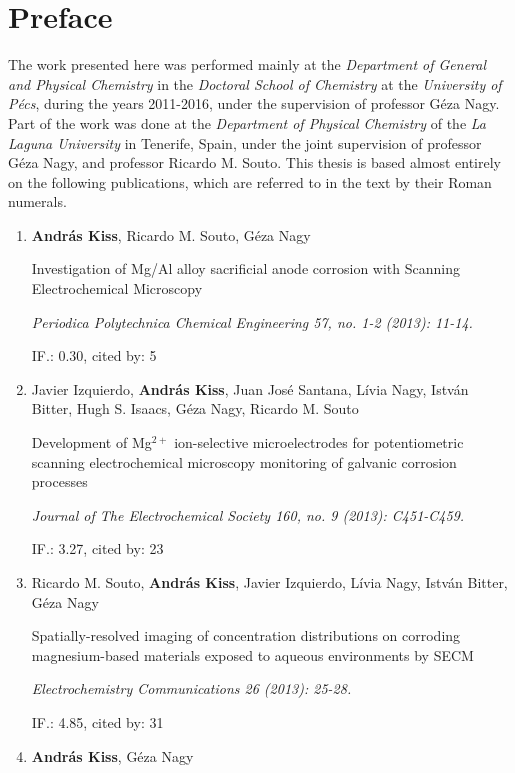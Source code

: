 \chapter*{Preface}
The work presented here was performed mainly at the \emph{Department of General and Physical Chemistry} in the \emph{Doctoral School of Chemistry} at the \emph{University of Pécs}, during the years 2011-2016, under the supervision of professor Géza Nagy.
Part of the work was done at the \emph{Department of Physical Chemistry} of the \emph{La Laguna University} in Tenerife, Spain, under the joint supervision of professor Géza Nagy, and professor Ricardo M. Souto.
This thesis is based almost entirely on the following publications, which are referred to in the text by their Roman numerals.

\begin{enumerate}
\item \textbf{András Kiss}, Ricardo M. Souto, Géza Nagy

Investigation of Mg/Al alloy sacrificial anode corrosion with Scanning Electrochemical Microscopy

\emph{Periodica Polytechnica Chemical Engineering 57, no. 1-2 (2013): 11-14.}

IF.: 0.30, cited by: 5

\item Javier Izquierdo, \textbf{András Kiss}, Juan José Santana, Lívia Nagy, István Bitter, Hugh S. Isaacs, Géza Nagy, Ricardo M. Souto

Development of Mg$^{2+}$ ion-selective microelectrodes for potentiometric scanning electrochemical microscopy monitoring of galvanic corrosion processes

\emph{Journal of The Electrochemical Society 160, no. 9 (2013): C451-C459.}

IF.: 3.27, cited by: 23

\item Ricardo M. Souto, \textbf{András Kiss}, Javier Izquierdo, Lívia Nagy, István Bitter, Géza Nagy

Spatially-resolved imaging of concentration distributions on corroding mag\-ne\-si\-um-based materials exposed to aqueous environments by SECM

\emph{Electrochemistry Communications 26 (2013): 25-28.}

IF.: 4.85, cited by: 31

\newpage
\item \textbf{András Kiss}, Géza Nagy


\end{enumerate}
